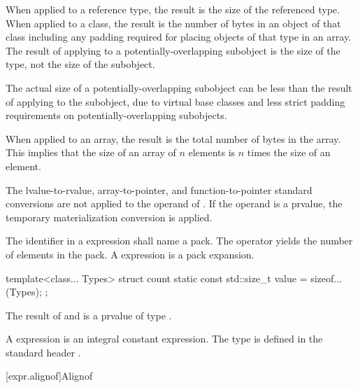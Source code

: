 \pnum
{}%
When applied to a reference type, the result is the size
of the referenced type.
%
When applied to a class, the result is the number of bytes in an object
of that class including any padding required for placing objects of that
type in an array.
The result of applying  to a
potentially-overlapping subobject is
the size of the type, not the size of the subobject.
\begin{footnote}
The actual size of a potentially-overlapping subobject
can be less than the result of
applying  to the subobject, due to virtual base classes
and less strict padding requirements on potentially-overlapping subobjects.
\end{footnote}
%
When applied to an array, the result is the total number of bytes in the
array. This implies that the size of an array of $n$ elements is
$n$ times the size of an element.

\pnum
The lvalue-to-rvalue,
array-to-pointer, and
function-to-pointer standard conversions are not
applied to the operand of .
If the operand is a prvalue,
the temporary materialization conversion
is applied.

\pnum
The identifier in a  expression shall name a
pack. The  operator yields the number of elements
in the pack.
A  expression is a pack expansion.
\begin{example}
\begin{codeblock}
template<class... Types>
struct count {
  static const std::size_t value = sizeof...(Types);
};
\end{codeblock}
\end{example}

\pnum
{}%
%
The result of  and  is a prvalue of type
.
\begin{note}
A  expression
is an integral constant expression.
The type  is defined in the standard header
.
\end{note}

[expr.alignof]{Alignof}

